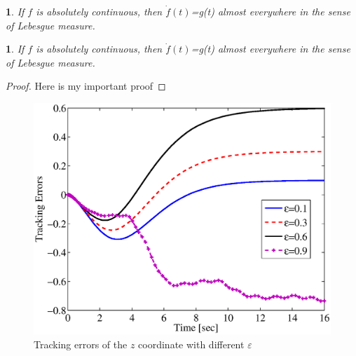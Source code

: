 \documentclass{article}
\theoremstyle{plain}
\theoremstyle{remark}
\theoremstyle{definition}
\theoremstyle{plain}
\newtheorem{lem}{\protect\lemmaname}
\theoremstyle{plain}
\newtheorem{cor}{\protect\corollaryname}
\providecommand{\corollaryname}{Corollary}
\providecommand{\lemmaname}{Lemma}
\begin{document}
\begin{lem}
If $f$ is absolutely continuous, then $\dot{f}(t)$=g(t) almost everywhere in the sense of Lebesgue measure.
\end{lem}

\begin{cor}
If $f$ is absolutely continuous, then $\dot{f}(t)$=g(t) almost everywhere in the sense of Lebesgue measure.
\end{cor}

\begin{proof}
Here is my important proof
\end{proof}

\begin{center}
\begin{figure}
\begin{centering}
\includegraphics[clip,width=0.6\linewidth]{name}
\end{centering}
\centering{}\caption{\label{fig:TCze0}Tracking errors of the $z$ coordinate with different
$\varepsilon$}
\end{figure}
\end{center}
\end{document}
